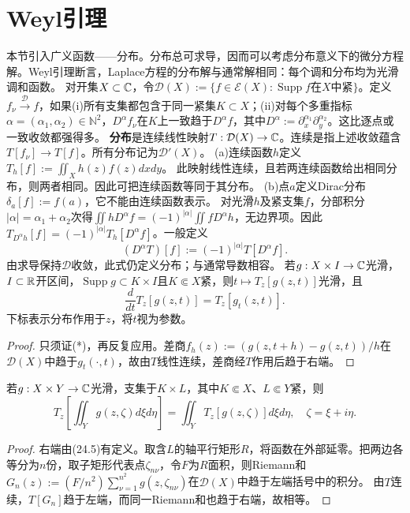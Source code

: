 \section{Weyl引理}
本节引入广义函数——分布。分布总可求导，因而可以考虑分布意义下的微分方程解。Weyl引理断言，Laplace方程的分布解与通常解相同：每个调和分布均为光滑调和函数。
对开集$X\subset\mathbb C$，令$\mathcal D(X):=\{f\in\mathcal E(X):\operatorname{Supp}f\text{在}X\text{中紧}\}$。定义$f_\nu\xrightarrow{\mathcal D}f$，如果(i)所有支集都包含于同一紧集$K\subset X$；(ii)对每个多重指标$\alpha=(\alpha_1,\alpha_2)\in\mathbb N^2$，$D^\alpha f_\nu$在$K$上一致趋于$D^\alpha f$，其中$D^\alpha:=\partial_x^{\alpha_1}\partial_y^{\alpha_2}$。这比逐点或一致收敛都强得多。
\textbf{分布}是连续线性映射$T:\mathcal D(X)\to\mathbb C$。连续是指上述收敛蕴含$T[f_\nu]\to T[f]$。所有分布记为$\mathcal D'(X)$。
(a)连续函数$h$定义$T_h[f]:=\iint_Xh(z)f(z)dxdy$。
此映射线性连续，且若两连续函数给出相同分布，则两者相同。因此可把连续函数等同于其分布。
(b)点$a$定义Dirac分布$\delta_a[f]:=f(a)$，它不能由连续函数表示。
对光滑$h$及紧支集$f$，分部积分$|\alpha|=\alpha_1+\alpha_2$次得$\iint hD^\alpha f=(-1)^{|\alpha|}\iint fD^\alpha h$，无边界项。因此$T_{D^\alpha h}[f]=(-1)^{|\alpha|}T_h[D^\alpha f]$。一般定义
\[
(D^\alpha T)[f]:=(-1)^{|\alpha|}T[D^\alpha f].
\]
由求导保持$\mathcal D$收敛，此式仍定义分布；与通常导数相容。
若$g:X\times I\to\mathbb C$光滑，$I\subset\mathbb R$开区间，$\operatorname{Supp}g\subset K\times I$且$K\Subset X$紧，则$t\mapsto T_z[g(z,t)]$光滑，且
\begin{equation}\frac d{dt}T_z[g(z,t)]=T_z[g_t(z,t)].\tag{*}\end{equation}
下标表示分布作用于$z$，将$t$视为参数。
\begin{proof}
只须证(*)，再反复应用。差商$f_h(z):=(g(z,t+h)-g(z,t))/h$在$\mathcal D(X)$中趋于$g_t(\cdot,t)$，故由$T$线性连续，差商经$T$作用后趋于右端。
\end{proof}
若$g:X\times Y\to\mathbb C$光滑，支集于$K\times L$，其中$K\Subset X$、$L\Subset Y$紧，则
\[
T_z\left[\iint_Yg(z,\zeta)d\xi d\eta\right]=\iint_YT_z[g(z,\zeta)]d\xi d\eta,
\quad\zeta=\xi+i\eta.
\]
\begin{proof}
右端由(24.5)有定义。取含$L$的轴平行矩形$R$，将函数在外部延零。把两边各等分为$n$份，取子矩形代表点$\zeta_{n\nu}$，令$F$为$R$面积，则Riemann和$G_n(z):=(F/n^2)\sum_{\nu=1}^{n^2}g(z,\zeta_{n\nu})$在$\mathcal D(X)$中趋于左端括号中的积分。
由$T$连续，$T[G_n]$趋于左端，而同一Riemann和也趋于右端，故相等。
\end{proof}
